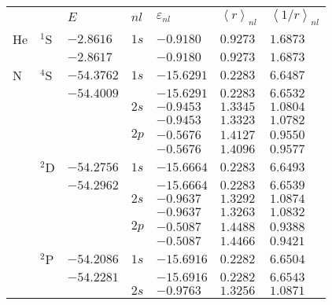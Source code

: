 \begin{table}
\begin{center}
\begin{tabular}{
>{\centering\arraybackslash}p{}
>{\centering\arraybackslash}p{}
>{\centering\arraybackslash}p{}
>{\centering\arraybackslash}p{}
>{\centering\arraybackslash}p{}
>{\centering\arraybackslash}p{}
>{\centering\arraybackslash}p{}}
\rowcolor{mydarkgray} 
   & & $E$ & $nl$ & $\varepsilon_{nl}$ & $\left<r\right>_{nl}$ 
   & $\left<1/r\right>_{nl}$ \\
He & $^1$S & $-2.8616$   & $1s$ & $-0.9180$  & $0.9273$ & $1.6873$ \\
\rowcolor{mygray} 
   &       & $-2.8617$   &      & $-0.9180$  & $0.9273$ & $1.6873$ \\
N  & $^4$S & $-54.3762$  & $1s$ & $-15.6291$ & $0.2283$ & $6.6487$ \\
\rowcolor{mygray} 
   &       & $-54.4009$  &      & $-15.6291$ & $0.2283$ & $6.6532$ \\
   &       &             & $2s$ & $-0.9453$  & $1.3345$ & $1.0804$ \\
   \rowcolor{mygray} 
   &       &             &      & $-0.9453$  & $1.3323$ & $1.0782$ \\
   &       &             & $2p$ & $-0.5676$  & $1.4127$ & $0.9550$ \\
   \rowcolor{mygray} 
   &       &             &      & $-0.5676$  & $1.4096$ & $0.9577$ \\
   & $^2$D & $-54.2756$  & $1s$ & $-15.6664$ & $0.2283$ & $6.6493$ \\
   \rowcolor{mygray} 
   &       & $-54.2962$  &      & $-15.6664$ & $0.2283$ & $6.6539$ \\
   &       &             & $2s$ & $-0.9637$  & $1.3292$ & $1.0874$ \\
   \rowcolor{mygray} 
   &       &             &      & $-0.9637$  & $1.3263$ & $1.0832$ \\
   &       &             & $2p$ & $-0.5087$  & $1.4488$ & $0.9388$ \\
   \rowcolor{mygray} 
   &       &             &      & $-0.5087$  & $1.4466$ & $0.9421$ \\
   & $^2$P & $-54.2086$  & $1s$ & $-15.6916$ & $0.2282$ & $6.6504$ \\
   \rowcolor{mygray} 
   &       & $-54.2281$  &      & $-15.6916$ & $0.2282$ & $6.6543$ \\
   &       &             & $2s$ & $-0.9763$  & $1.3256$ & $1.0871$ \\

\end{tabular}
\end{center}
\end{table}
